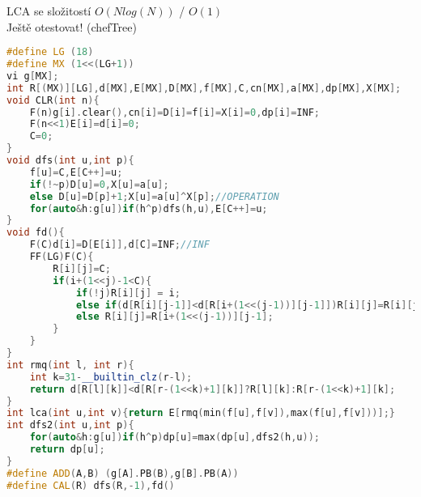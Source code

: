 \documentclass[11pt]{article}
\begin{document}
LCA se složitostí $O(Nlog(N))$ / $O(1)$
\\Ještě otestovat! (chefTree)
\begin{lstlisting}[language=C++]
#define LG (18)
#define MX (1<<(LG+1))
vi g[MX];
int R[(MX)][LG],d[MX],E[MX],D[MX],f[MX],C,cn[MX],a[MX],dp[MX],X[MX];
void CLR(int n){
    F(n)g[i].clear(),cn[i]=D[i]=f[i]=X[i]=0,dp[i]=INF;
    F(n<<1)E[i]=d[i]=0;
    C=0;
}
void dfs(int u,int p){
    f[u]=C,E[C++]=u;
    if(!~p)D[u]=0,X[u]=a[u];
    else D[u]=D[p]+1;X[u]=a[u]^X[p];//OPERATION
    for(auto&h:g[u])if(h^p)dfs(h,u),E[C++]=u;
}
void fd(){
    F(C)d[i]=D[E[i]],d[C]=INF;//INF
    FF(LG)F(C){
        R[i][j]=C;
        if(i+(1<<j)-1<C){
            if(!j)R[i][j] = i;
            else if(d[R[i][j-1]]<d[R[i+(1<<(j-1))][j-1]])R[i][j]=R[i][j-1];
            else R[i][j]=R[i+(1<<(j-1))][j-1];
        }
    }
}
int rmq(int l, int r){
    int k=31-__builtin_clz(r-l);
    return d[R[l][k]]<d[R[r-(1<<k)+1][k]]?R[l][k]:R[r-(1<<k)+1][k];
}
int lca(int u,int v){return E[rmq(min(f[u],f[v]),max(f[u],f[v]))];}
int dfs2(int u,int p){
    for(auto&h:g[u])if(h^p)dp[u]=max(dp[u],dfs2(h,u));
    return dp[u];
}
#define ADD(A,B) (g[A].PB(B),g[B].PB(A))
#define CAL(R) dfs(R,-1),fd()

\end{lstlisting}
\end{document}
